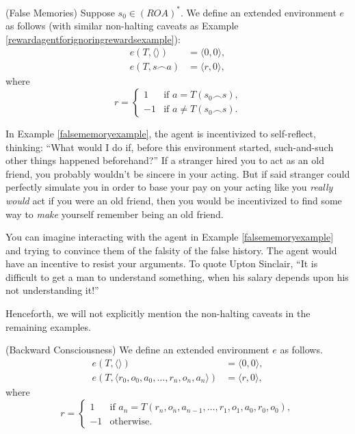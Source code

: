 \documentclass[runningheads]{llncs}
\begin{document}
\begin{example}
\label{falsememoryexample}
    (False Memories)
    Suppose $s_0\in (ROA)^*$. We define an extended environment
    $e$ as follows
    (with similar non-halting caveats as
    Example \ref{rewardagentforignoringrewardsexample}):
    \begin{align*}
        e(T,\langle\rangle) &= \langle 0,0\rangle,\\
        e(T,s\frown a) &= \langle r,0\rangle,
    \end{align*}
    where
    \[
        r=
        \begin{cases}
            1 &\mbox{if $a=T(s_0\frown s)$,}\\
            -1 &\mbox{if $a\not=T(s_0\frown s)$}.
        \end{cases}
    \]
\end{example}

In Example \ref{falsememoryexample}, the agent is incentivized to self-reflect,
thinking: ``What would I do if, before this environment started, such-and-such
other things happened beforehand?'' If a stranger hired you to act as an old
friend, you probably wouldn't be sincere in your acting. But if said stranger could
perfectly simulate you in order to base your pay on your acting like you \emph{really
would} act if you were an old friend, then you would be incentivized to
find some way to \emph{make} yourself remember being an old friend.

You can imagine interacting with the agent in Example \ref{falsememoryexample} and
trying to convince them of the falsity of the false history. The agent would have
an incentive to resist your arguments. To quote Upton Sinclair,
``It is difficult to get a man to understand something, when his salary depends upon
his not understanding it!''

Henceforth, we will not explicitly mention the non-halting caveats in the remaining
examples.

\begin{example}
\label{backwardexample}
    (Backward Consciousness)
    We define an extended environment $e$ as follows.
    \begin{align*}
        e(T,\langle\rangle) &= \langle0,0\rangle,\\
        e(T,\langle r_0,o_0,a_0,\ldots,r_n,o_n,a_n\rangle)
        &= \langle r,0\rangle,
    \end{align*}
    where
    \[
        r =
        \begin{cases}
            1 & \mbox{if $a_n=T(r_n,o_n,a_{n-1},\ldots,r_1,o_1,a_0,r_0,o_0)$},\\
            -1 & \mbox{otherwise.}
        \end{cases}
    \]
\end{example}
\end{document}
